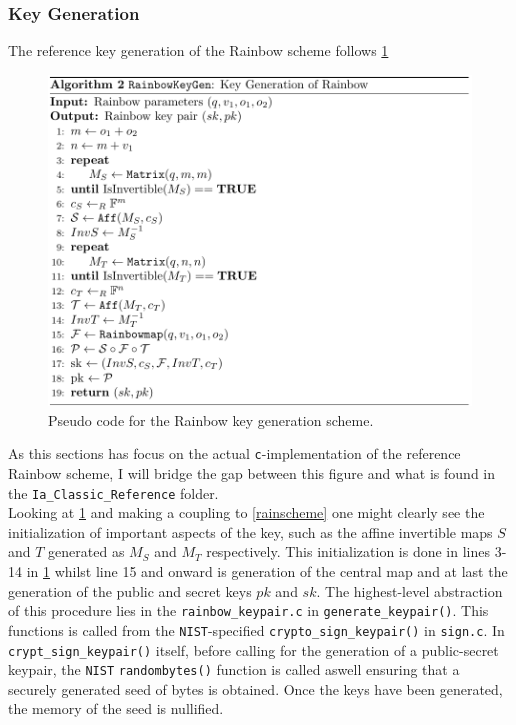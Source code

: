 \subsubsection{Key Generation} \label{section:keygen}
The reference key generation of the Rainbow scheme follows \cref{rainbowkeygen}
\begin{figure}[t]
    \centering
    \includegraphics[width=\textwidth]{resources/rainbowkeygen.png}
    \caption{Pseudo code for the Rainbow key generation scheme.}
    \label{rainbowkeygen}
\end{figure}
As this sections has focus on the actual \texttt{c}-implementation of the reference Rainbow scheme, I will bridge the gap between this figure and what is found in the \texttt{Ia\_Classic\_Reference} folder.\medskip\\
Looking at \cref{rainbowkeygen} and making a coupling to \cref{rainscheme} one might clearly see the initialization of important aspects of the key, such as the affine invertible maps $S$ and $T$ generated as $M_S$ and $M_T$ respectively. This initialization is done in lines 3-14 in \cref{rainbowkeygen} whilst line 15 and onward is generation of the central map and at last the generation of the public and secret keys $pk$ and $sk$. The highest-level abstraction of this procedure lies in the \texttt{rainbow\_keypair.c} in \texttt{generate\_keypair()}. This functions is called from the \texttt{NIST}-specified \texttt{crypto\_sign\_keypair()} in \texttt{sign.c}. In \texttt{crypt\_sign\_keypair()} itself, before calling for the generation of a public-secret keypair, the \texttt{NIST} \texttt{randombytes()} function is called aswell ensuring that a securely generated seed of bytes is obtained. Once the keys have been generated, the memory of the seed is nullified.\medskip\\
